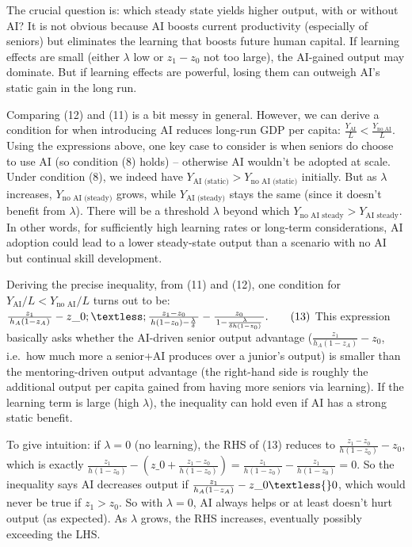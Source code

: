 \documentclass[12pt]{article}
\begin{document}
The crucial question is: {which steady state yields higher output,
with or without AI?} It is not obvious because {AI boosts current
productivity} (especially of seniors) but {eliminates the
learning that boosts future human capital}. If learning effects are
small (either \(\lambda\) low or \(z_1 - z_0\) not too large), the
AI-gained output may dominate. But if learning effects are powerful,
losing them can outweigh AI's static gain in the long run.

Comparing (12) and (11) is a bit messy in general. However, we can
derive a condition for when introducing AI {reduces long-run GDP
per capita}: \(\frac{Y_{\text{AI}}}{L} < \frac{Y_{\text{no AI}}}{L}.\)
Using the expressions above, one key case to consider is when seniors
{do} choose to use AI (so condition (8) holds) -- otherwise AI
wouldn't be adopted at scale. Under condition (8), we indeed have
\(Y_{\text{AI (static)}} > Y_{\text{no AI (static)}}\) initially. But as
\(\lambda\) increases, \(Y_{\text{no AI (steady)}}\) grows, while
\(Y_{\text{AI (steady)}}\) stays the same (since it doesn't benefit from
\(\lambda\)). There will be a threshold \(\lambda\) beyond which
\(Y_{\text{no AI steady}} > Y_{\text{AI steady}}\). In other words,
{for sufficiently high learning rates or long-term
considerations, AI adoption could lead to a lower steady-state output}
than a scenario with no AI but continual skill development.

Deriving the precise inequality, from (11) and (12), one condition for
\(Y_{\text{AI}}/L < Y_{\text{no AI}}/L\) turns out to be: $
\frac{z_1}{\,h_A(1-z_A)\,} - z\_0 ;\textless;
\frac{z_1 - z_0}{\,h(1-z_0) - \frac{\lambda}{\delta}\,} -
\frac{z_0}{\,1 - \frac{\lambda}{\delta h(1-z_0)}\,}. \tag{13}$ This
expression basically asks whether the {AI-driven senior output
advantage} (\(\frac{z_1}{h_A(1-z_A)} - z_0\), i.e.~how much more a
senior+AI produces over a junior's output) is smaller than the
{mentoring-driven output advantage} (the right-hand side is
roughly the additional output per capita gained from having more seniors
via learning). If the learning term is large (high \(\lambda\)), the
inequality can hold even if AI has a strong static benefit.

To give intuition: if \(\lambda = 0\) (no learning), the RHS of (13)
reduces to \(\frac{z_1 - z_0}{h(1-z_0)} - z_0\), which is exactly $
\frac{z_1}{h(1-z_0)} - (z\_0 + \frac{z_1 - z_0}{h(1-z_0)}) =
\frac{z_1}{h(1-z_0)} - \frac{z_1}{h(1-z_0)} = 0$. So the inequality
says AI decreases output if $ \frac{z_1}{h_A(1-z_A)} - z\_0 \textless{}
0$, which would {never} be true if \(z_1 > z_0\). So with
\(\lambda=0\), AI always helps or at least doesn't hurt output (as
expected). As \(\lambda\) grows, the RHS increases, eventually possibly
exceeding the LHS.
\end{document}
